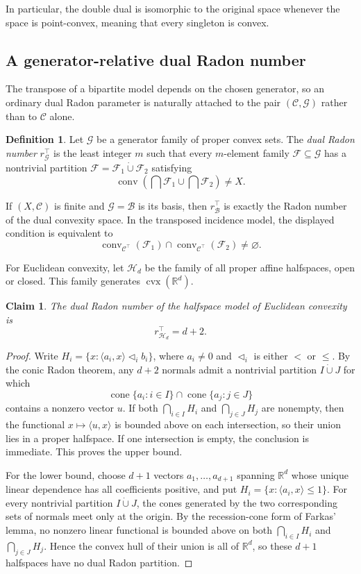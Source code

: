 \documentclass[11pt]{article}
\newtheorem{claim}[thm]{Claim}
\theoremstyle{definition}
\newtheorem{definition}[thm]{Definition}
\newcommand{\F}{\mathcal{F}}
\newcommand{\C}{\mathcal{C}}
\newcommand{\B}{\mathcal{B}}
\newcommand{\G}{\mathcal{G}}
\newcommand{\conv}{\operatorname{conv}}
\newcommand{\cvx}{\operatorname{cvx}}
\renewcommand{\Re}{\mathbb{R}}
\begin{document}
In particular, the double dual is isomorphic to the original space whenever the space is point-convex, meaning that every singleton is convex.

\subsection{A generator-relative dual Radon number}\label{subsec:bipartite:dualRadon}
The transpose of a bipartite model depends on the chosen generator, so an ordinary dual Radon parameter is naturally attached to the pair $(\C,\G)$ rather than to $\C$ alone.

\begin{definition}
Let $\G$ be a generator family of proper convex sets. The \emph{dual Radon number} $r^\top_{\G}$ is the least integer $m$ such that every $m$-element family $\F\subseteq\G$ has a nontrivial partition $\F=\F_1\mathbin{\dot\cup}\F_2$ satisfying
\[
\conv\left(\bigcap\F_1\cup\bigcap\F_2\right)\ne X.
\]
\end{definition}

If $(X,\C)$ is finite and $\G=\B$ is its basis, then $r^\top_{\B}$ is exactly the Radon number of the dual convexity space. In the transposed incidence model, the displayed condition is equivalent to
\[
\conv_{\C^\top}(\F_1)\cap\conv_{\C^\top}(\F_2)\ne\varnothing.
\]

For Euclidean convexity, let $\mathcal H_d$ be the family of all proper affine halfspaces, open or closed. This family generates $\cvx(\Re^d)$.

\begin{claim}
The dual Radon number of the halfspace model of Euclidean convexity is
\[
r^\top_{\mathcal H_d}=d+2.
\]
\end{claim}

\begin{proof}
Write $H_i=\{x:\langle a_i,x\rangle\mathrel{\triangleleft_i}b_i\}$, where $a_i\ne0$ and $\triangleleft_i$ is either $<$ or $\le$. By the conic Radon theorem, any $d+2$ normals admit a nontrivial partition $I\mathbin{\dot\cup}J$ for which
\[
\operatorname{cone}\{a_i:i\in I\}\cap
\operatorname{cone}\{a_j:j\in J\}
\]
contains a nonzero vector $u$. If both $\bigcap_{i\in I}H_i$ and $\bigcap_{j\in J}H_j$ are nonempty, then the functional $x\mapsto\langle u,x\rangle$ is bounded above on each intersection, so their union lies in a proper halfspace. If one intersection is empty, the conclusion is immediate. This proves the upper bound.

For the lower bound, choose $d+1$ vectors $a_1,\ldots,a_{d+1}$ spanning $\Re^d$ whose unique linear dependence has all coefficients positive, and put $H_i=\{x:\langle a_i,x\rangle\le1\}$. For every nontrivial partition $I\mathbin{\dot\cup}J$, the cones generated by the two corresponding sets of normals meet only at the origin. By the recession-cone form of Farkas' lemma, no nonzero linear functional is bounded above on both $\bigcap_{i\in I}H_i$ and $\bigcap_{j\in J}H_j$. Hence the convex hull of their union is all of $\Re^d$, so these $d+1$ halfspaces have no dual Radon partition.
\end{proof}
\end{document}
